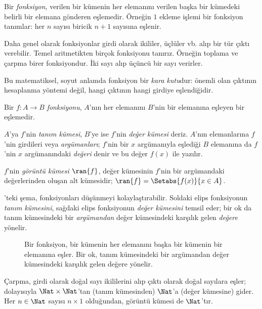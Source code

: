 \documentclass[../../../include/open-logic-section]{subfiles}
\begin{document}

\begin{explain}
Bir \emph{fonksiyon}, verilen bir kümenin her elemanını verilen başka bir
kümedeki belirli bir elemana gönderen eşlemedir. Örneğin $1$ ekleme işlemi bir
fonksiyon tanımlar: her $n$ sayısı biricik $n+1$ sayısına eşlenir.

Daha genel olarak fonksiyonlar girdi olarak ikililer, üçlüler vb. alıp bir tür
çıktı verebilir. Temel aritmetikten birçok fonksiyonu tanırız. Örneğin toplama
ve çarpma birer fonksiyondur. İki sayı alıp üçüncü bir sayı verirler.

Bu matematiksel, soyut anlamda fonksiyon bir \emph{kara kutu}dur: önemli olan
çıktının hesaplanma yöntemi değil, hangi çıktının hangi girdiye eşlendiğidir.
\end{explain}

\begin{defn}[Fonksiyon]
Bir $f \colon A \to B$ \emph{fonksiyonu}, $A$'nın her elemanını $B$'nin bir
elemanına eşleyen bir eşlemedir.

$A$'ya $f$'nin \emph{tanım kümesi}, $B$'ye ise $f$'nin \emph{değer kümesi}
deriz. $A$'nın elemanlarına $f$'nin girdileri veya \emph{argümanları};
$f$'nin bir $x$ argümanıyla eşlediği $B$ elemanına da $f$'nin $x$
argümanındaki \emph{değeri} denir ve bu değer $f(x)$ ile yazılır.

$f$'nin \emph{görüntü kümesi} $\ran{f}$, değer kümesinin $f$'nin bir
argümandaki değerlerinden oluşan alt kümesidir; $\ran{f} =
\Setabs{f(x)}{x \in A}$.
\end{defn}

'teki şema, fonksiyonları düşünmeyi kolaylaştırabilir.
Soldaki elips fonksiyonun \emph{tanım kümesini}, sağdaki elips fonksiyonun
\emph{değer kümesini} temsil eder; bir ok da tanım kümesindeki bir
\emph{argümandan} değer kümesindeki karşılık gelen \emph{değere} yönelir.

\begin{figure}
  \caption{Bir fonksiyon, bir kümenin her elemanını başka bir kümenin bir
    elemanına eşler. Bir ok, tanım kümesindeki bir argümandan değer
    kümesindeki karşılık gelen değere yönelir.}
\end{figure}

\begin{ex}
Çarpma, girdi olarak doğal sayı ikililerini alıp çıktı olarak doğal sayılara
eşler; dolayısıyla $\Nat \times \Nat$'tan (tanım kümesinden) $\Nat$'a (değer
kümesine) gider. Her $n \in \Nat$ sayısı $n \times 1$ olduğundan, görüntü
kümesi de $\Nat$'tır.
\end{ex}
\end{document}
